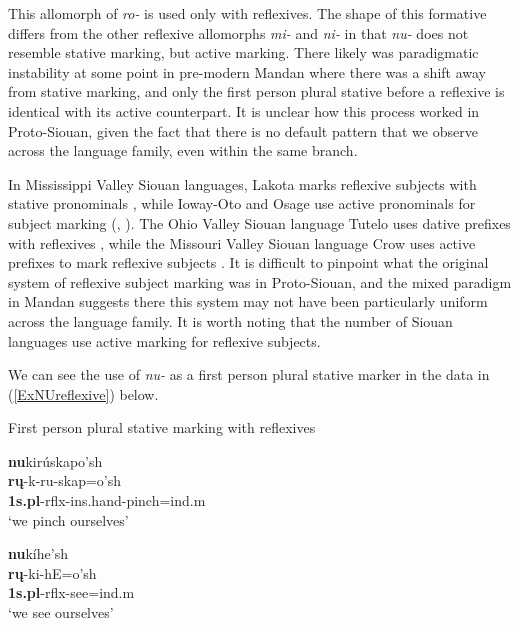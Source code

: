 
This allomorph of \textit{ro-} is used only with reflexives. The shape of this formative differs from the other reflexive allomorphs \textit{mi-} and \textit{ni-} in that \textit{nu-} does not resemble stative marking, but active marking. There likely was paradigmatic instability at some point in pre-modern Mandan where there was a shift away from stative marking, and only the first person plural stative before a reflexive is identical with its active counterpart. It is unclear how this process worked in Proto-Siouan, given the fact that there is no default pattern that we observe across the language family, even within the same branch. 

In Mississippi Valley Siouan languages, Lakota  marks reflexive subjects with stative pronominals \citep[23]{ingham2003}, while Ioway-Oto and Osage use active pronominals for subject marking (\citealt[244]{whitman1947}, \citealt[244]{quintero2004}). The Ohio Valley Siouan language Tutelo uses dative prefixes with reflexives \citep[77]{oliverio1997}, while the Missouri Valley Siouan language Crow uses active prefixes to mark reflexive subjects \citep[149]{graczyk2007}. It is difficult to pinpoint what the original system of reflexive subject marking was in Proto-Siouan, and the mixed paradigm in Mandan suggests there this system may not have been particularly uniform across the language family. It is worth noting that the number of Siouan languages use active marking for reflexive subjects.

We can see the use of \textit{nu-} as a first person plural stative marker in the data in (\ref{ExNUreflexive}) below.



\begin{exe}

\item\label{ExNUreflexive} First person plural stative marking with reflexives

	\begin{xlist}

	\item \glll \textbf{nu}kirúskapo'sh\\
	\textbf{rų}-k-ru-skap=o'sh\\
	\textbf{1s.pl}-rflx-ins.hand-\textnormal{pinch}=ind.m\\
	\glt `we pinch ourselves' \citep[440]{hollow1970}
	
	\item \glll \textbf{nu}kíhe'sh\\
	\textbf{rų}-ki-hE=o'sh\\
	\textbf{1s.pl}-rflx-\textnormal{see}=ind.m\\
	\glt `we see ourselves' \citep[475]{hollow1970}
	
	\end{xlist}

\end{exe}

